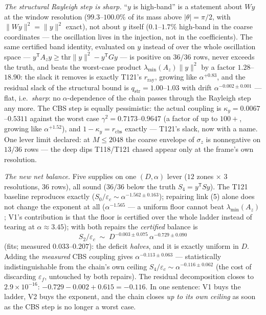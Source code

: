 \documentclass[11pt,a4paper]{article}
\begin{document}
\emph{The structural Rayleigh step is sharp.} ``$y$ is high-band'' is a statement about $Wy$ at
the window resolution ($99.3$--$100.0\%$ of its mass above $|\theta|=\pi/2$, with
$\|Wy\|^2=\|y\|^2$ exact), not about $y$ itself ($0.1$--$1.7\%$ high-band in the coarse
coordinates --- the oscillation lives in the injection, not in the coefficients). The same
certified band identity, evaluated on $y$ instead of over the whole oscillation space ---
$y^{\mathsf T}A_zy\ge\mathrm{thr}\|y\|^2-y^{\mathsf T}Gy$ --- is positive on $36/36$ rows,
never exceeds the truth, and beats the worst-case product $\lambda_{\min}(A_z)\|y\|^2$ by a
factor $1.28$--$18.90$: the slack it removes is exactly T121's $r_{\mathrm{ray}}$, growing like
$\alpha^{+0.83}$, and the residual slack of the structural bound is
$q_{\mathrm{str}}=1.00$--$1.03$ with drift $\alpha^{-0.002\pm0.001}$ --- flat, i.e.\
\emph{sharp}: no $\alpha$-dependence of the chain passes through the Rayleigh step any more.
The CBS step is equally pessimistic: the actual coupling is $\kappa_y=0.0067$--$0.5311$ against
the worst case $\gamma^2=0.7173$--$0.9647$ (a factor of up to $100+$, growing like
$\alpha^{+1.52}$), and $1-\kappa_y=r_{\mathrm{cbs}}$ exactly --- T121's slack, now with a name.
One lever limit declared: at $M\le2048$ the coarse envelope of $\sigma_z$ is nonnegative on
$13/36$ rows --- the deep dips T118/T121 chased appear only at the frame's own resolution.

\emph{The new net balance.} Five supplies on one $(D,\alpha)$ lever ($12$ zones $\times$ $3$
resolutions, $36$ rows), all sound ($36/36$ below the truth $S_4=y^{\mathsf T}Sy$). The T121
baseline reproduces exactly ($S_0/\varepsilon_c\sim\alpha^{-1.562\pm0.163}$); repairing link
(5) alone does not change the exponent at all ($\alpha^{-1.565}$ --- a uniform floor cannot
beat $\lambda_{\min}(A_z)$; V1's contribution is that the floor is certified over the whole
ladder instead of tearing at $\alpha\approx3.45$); with both repairs the \emph{certified}
balance is
\[
S_2/\varepsilon_c\;\sim\;D^{-0.003\pm0.075}\,\alpha^{-0.729\pm0.090}
\]
(fits; measured $0.033$--$0.207$): the deficit \emph{halves}, and it is exactly uniform in $D$.
Adding the \emph{measured} CBS coupling gives $\alpha^{-0.113\pm0.063}$ --- statistically
indistinguishable from the chain's own ceiling $S_4/\varepsilon_c\sim\alpha^{-0.116\pm0.062}$
(the cost of discarding $\varepsilon_f$, untouched by both repairs). The residual decomposition
closes to $2.9\times10^{-16}$: $-0.729-0.002+0.615=-0.116$. In one sentence: V1 buys the ladder,
V2 buys the exponent, and the chain closes \emph{up to its own ceiling} as soon as the CBS step
is no longer a worst case.
\end{document}
